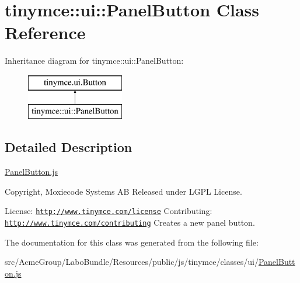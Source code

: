 \hypertarget{classtinymce_1_1ui_1_1_panel_button}{\section{tinymce\+:\+:ui\+:\+:Panel\+Button Class Reference}
\label{classtinymce_1_1ui_1_1_panel_button}
}
Inheritance diagram for tinymce\+:\+:ui\+:\+:Panel\+Button\+:\begin{figure}[H]
\begin{center}
\leavevmode
\includegraphics[height=2.000000cm]{classtinymce_1_1ui_1_1_panel_button}
\end{center}
\end{figure}


\subsection{Detailed Description}
\hyperlink{_panel_button_8js}{Panel\+Button.\+js}

Copyright, Moxiecode Systems A\+B Released under L\+G\+P\+L License.

License\+: \href{http://www.tinymce.com/license}{\tt http\+://www.\+tinymce.\+com/license} Contributing\+: \href{http://www.tinymce.com/contributing}{\tt http\+://www.\+tinymce.\+com/contributing} Creates a new panel button. 

The documentation for this class was generated from the following file\+:\begin{DoxyCompactItemize}
\item 
src/\+Acme\+Group/\+Labo\+Bundle/\+Resources/public/js/tinymce/classes/ui/\hyperlink{_panel_button_8js}{Panel\+Button.\+js}\end{DoxyCompactItemize}
